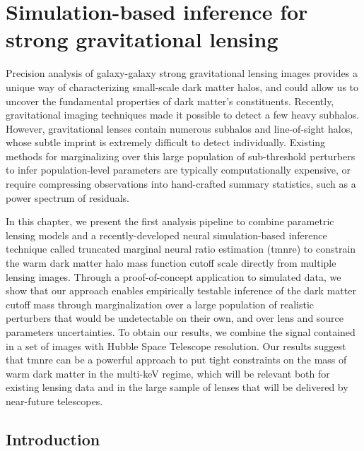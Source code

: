 \chapter{Simulation-based inference for strong gravitational lensing} \label{cha:lensing}


Precision analysis of galaxy-galaxy strong gravitational lensing images provides a unique way of characterizing small-scale dark matter halos, and could allow us to uncover the fundamental properties of dark matter's constituents. Recently, gravitational imaging techniques made it possible to detect a few heavy subhalos. However, gravitational lenses contain numerous subhalos and line-of-sight halos, whose subtle imprint is extremely difficult to detect individually. Existing methods for marginalizing over this large population of sub-threshold perturbers to infer population-level parameters are typically computationally expensive, or require compressing observations into hand-crafted summary statistics, such as a power spectrum of residuals.

In this chapter, we present the first analysis pipeline to combine parametric lensing models and a recently-developed neural simulation-based inference technique called truncated marginal neural ratio estimation (\gls*{tmnre}) to constrain the warm dark matter halo mass function cutoff scale directly from multiple lensing images. Through a proof-of-concept application to simulated data, we show that our approach enables empirically testable inference of the dark matter cutoff mass through marginalization over a large population of realistic perturbers that would be undetectable on their own, and over lens and source parameters uncertainties. To obtain our results, we combine the signal contained in a set of images with Hubble Space Telescope resolution. Our results suggest that \gls*{tmnre} can be a powerful approach to put tight constraints on the mass of warm dark matter in the multi-keV regime, which will be relevant both for existing lensing data and in the large sample of lenses that will be delivered by near-future telescopes.



\section{Introduction} \label{sec:sl-intro}


